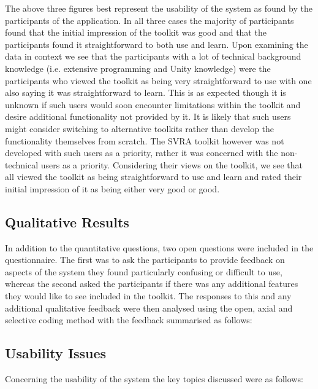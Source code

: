 \documentclass{l4proj}
\begin{document}
The above three figures best represent the usability of the system as found by the participants of the application. In all three cases the majority of participants found that the initial impression of the toolkit was good and that the participants found it straightforward to both use and learn. Upon examining the data in context we see that the participants with a lot of technical background knowledge (i.e. extensive programming and Unity knowledge) were the participants who viewed the toolkit as being very straightforward to use with one also saying it was straightforward to learn. This is as expected though it is unknown if such users would soon encounter limitations within the toolkit and desire additional functionality not provided by it. It is likely that such users might consider switching to alternative toolkits rather than develop the functionality themselves from scratch. The SVRA toolkit however was not developed with such users as a priority, rather it was concerned with the non-technical users as a priority. Considering their views on the toolkit, we see that all viewed the toolkit as being straightforward to use and learn and rated their initial impression of it as being either very good or good.

\subsection{Qualitative Results}
\label{sec:evlauationqual1}
In addition to the quantitative questions, two open questions were included in the questionnaire. The first was to ask the participants to provide feedback on aspects of the system they found particularly confusing or difficult to use, whereas the second asked the participants if there was any additional features they would like to see included in the toolkit. The responses to this and any additional qualitative feedback were then analysed using the open, axial and selective coding method \cite{openaxebook} with the feedback summarised as follows:

\subsection{Usability Issues}
Concerning the usability of the system the key topics discussed were as follows:
\end{document}
